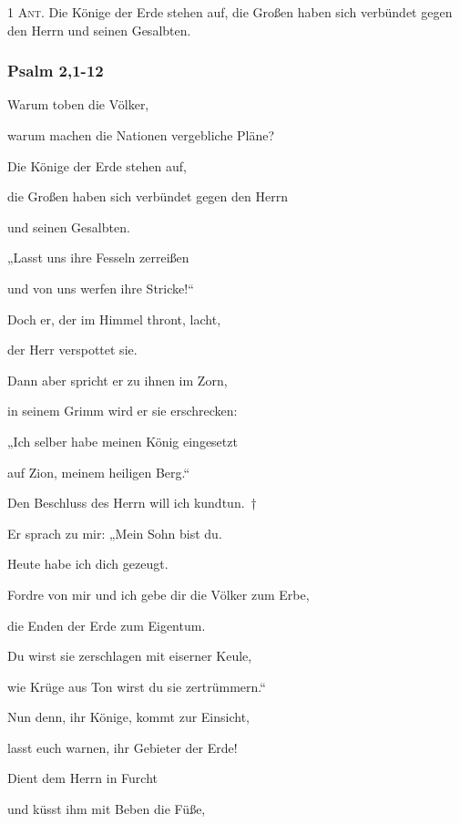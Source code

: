 \noindent \textsc{1 Ant.} Die Könige der Erde stehen auf, die Großen haben sich verbündet gegen den Herrn und seinen Gesalbten.

\subsubsection{Psalm 2,1-12}

\noindent Warum toben die Völker,~\GreStar{}~\nopagebreak

warum machen die Nationen vergebliche Pläne?
 
\noindent Die Könige der Erde stehen auf,~\GreStar{}~\nopagebreak

die Großen haben sich verbündet gegen den Herrn 

und seinen Gesalbten.
 
\noindent „Lasst uns ihre Fesseln zerreißen~\GreStar{}~\nopagebreak

und von uns werfen ihre Stricke!“
 
\noindent Doch er, der im Himmel thront, lacht,~\GreStar{}~\nopagebreak

der Herr verspottet sie.
 
\noindent Dann aber spricht er zu ihnen im Zorn,~\GreStar{}~\nopagebreak

in seinem Grimm wird er sie erschrecken:
 
\noindent „Ich selber habe meinen König eingesetzt~\GreStar{}~\nopagebreak

auf Zion, meinem heiligen Berg.“
 
\noindent Den Beschluss des Herrn will ich kundtun.~†~\nopagebreak

Er sprach zu mir: „Mein Sohn bist du.~\GreStar{}~\nopagebreak

Heute habe ich dich gezeugt.
 
\noindent Fordre von mir und ich gebe dir die Völker zum Erbe,~\GreStar{}~\nopagebreak

die Enden der Erde zum Eigentum.
 
\noindent Du wirst sie zerschlagen mit eiserner Keule,~\GreStar{}~\nopagebreak

wie Krüge aus Ton wirst du sie zertrümmern.“
 
\noindent Nun denn, ihr Könige, kommt zur Einsicht,~\GreStar{}~\nopagebreak

lasst euch warnen, ihr Gebieter der Erde!
 
\noindent Dient dem Herrn in Furcht~\GreStar{}~\nopagebreak

und küsst ihm mit Beben die Füße,
 
